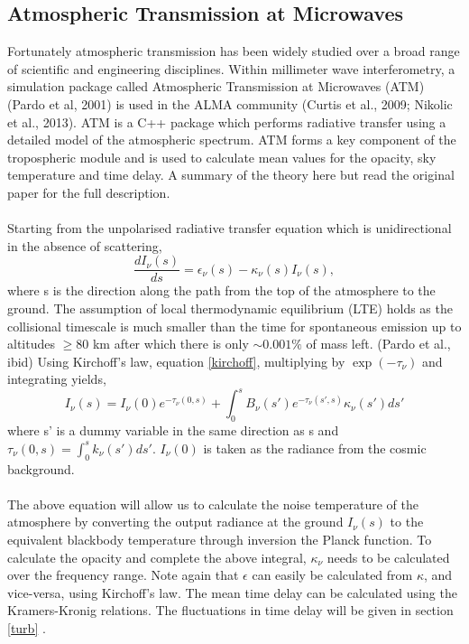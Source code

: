 \subsection{Atmospheric Transmission at Microwaves} \label{ATM}
Fortunately atmospheric transmission has been widely studied over a broad range of scientific and engineering disciplines. Within millimeter wave interferometry, a simulation package called  Atmospheric Transmission at Microwaves (ATM) (Pardo et al, 2001) is used in the ALMA community (Curtis et al., 2009; Nikolic et al., 2013).  ATM is a C++ package which performs radiative transfer using a detailed model of the atmospheric spectrum. ATM forms a key component of the tropospheric module and is used to calculate mean values for the opacity, sky temperature and time delay. A summary of the theory here but read the original paper for the full description. \\
~\\
Starting from the unpolarised radiative transfer equation which is unidirectional in the absence of scattering,
\begin{equation}
\frac{dI_\nu (s) }{ds} = \epsilon_\nu(s) -\kappa_\nu(s)  I_\nu (s),
\end{equation}
where s is the direction along the path from the top of the atmosphere to the ground. The assumption of local thermodynamic equilibrium (LTE) holds as the collisional timescale is much smaller than the time for spontaneous emission up to altitudes $\ge 80$ km after which there is only $\sim 0.001\%$ of mass left. (Pardo et al., ibid) Using Kirchoff's law, equation \ref{kirchoff}, multiplying by $\exp(-\tau_\nu)$ and integrating yields, 
\begin{equation}
I_\nu(s) = I_\nu(0) e^{-\tau_\nu (0,s) }+ \int_0^s B_\nu(s')e^{-\tau_\nu (s',s) }\kappa_\nu(s')ds'
\end{equation}
where  s' is a dummy variable in the same direction as s and $\tau_\nu (0,s) = \int_0^{s} k_\nu(s')ds'$. $I_\nu(0)$ is taken as the radiance from the cosmic background.\\
~\\
The above equation will allow us to calculate the noise temperature of the atmosphere by converting the output radiance at the ground $I_\nu(s)$ to  the equivalent blackbody temperature through inversion the Planck function. To calculate the opacity and complete the above integral, $\kappa_\nu$ needs to be calculated over the frequency range. Note again that  $\epsilon$ can easily be calculated from $\kappa$, and vice-versa, using Kirchoff's law.  The mean time delay can be calculated using the Kramers-Kronig relations. The fluctuations in time delay will be given in section \ref{turb} .\\
